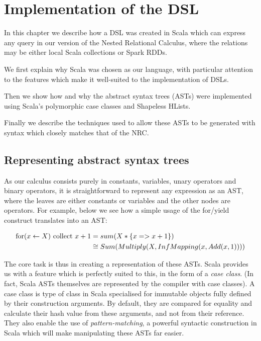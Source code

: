 \chapter{Implementation of the DSL} \label{dsl}

In this chapter we describe how a DSL was created in Scala which can express any query in our version of the Nested Relational Calculus, where the relations may be either local Scala collections or Spark RDDs.

We first explain why Scala was chosen as our language, with particular attention to the features which make it well-suited to the implementation of DSLs.

Then we show how and why the abstract syntax trees (ASTs) were implemented using Scala's polymorphic case classes and Shapeless HLists.

Finally we describe the techniques used to allow these ASTs to be generated with syntax which closely matches that of the NRC.

\section{Representing abstract syntax trees}

As our calculus consists purely in constants, variables, unary operators and binary operators, it is straightforward to represent any expression as an AST, where the leaves are either constants or variables and the other nodes are operators. For example, below we see how a simple usage of the for/yield construct translates into an AST:

\begin{equation*}
\begin{split}
\textrm{for}(x \leftarrow X) \textrm{ collect } x + 1 &= sum(X*\{x => x + 1\}) \\
&\cong Sum(Multiply(X,InfMapping(x,Add(x,1))))
\end{split}
\end{equation*}

The core task is thus in creating a representation of these ASTs. Scala provides us with a feature which is perfectly suited to this, in the form of a \textit{case class}. (In fact, Scala ASTs themselves are represented by the compiler with case classes). A case class is type of class in Scala specialised for immutable objects fully defined by their construction arguments. By default, they are compared for equality and calculate their hash value from these arguments, and not from their reference. They also enable the use of \textit{pattern-matching}, a powerful syntactic construction in Scala which will make manipulating these ASTs far easier.

